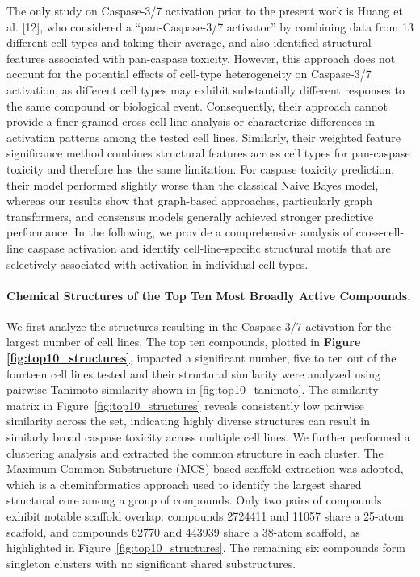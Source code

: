 \documentclass[letterpaper]{article}
\begin{document}
The only study on Caspase-3/7 activation prior to the present work is Huang et al. [12], who considered a “pan-Caspase-3/7 activator” by combining data from 13 different cell types and taking their average, and also identified structural features associated with pan-caspase toxicity. However, this approach does not account for the potential effects of cell-type heterogeneity on Caspase-3/7 activation, as different cell types may exhibit substantially different responses to the same compound or biological event. Consequently, their approach cannot provide a finer-grained cross-cell-line analysis or characterize differences in activation patterns among the tested cell lines. Similarly, their weighted feature significance method combines structural features across cell types for pan-caspase toxicity and therefore has the same limitation. For caspase toxicity prediction, their model performed slightly worse than the classical Naive Bayes model, whereas our results show that graph-based approaches, particularly graph transformers, and consensus models generally achieved stronger predictive performance. In the following, we provide a comprehensive analysis of cross-cell-line caspase activation and identify cell-line-specific structural motifs that are selectively associated with activation in individual cell types.



\paragraph{Chemical Structures of the Top Ten Most Broadly Active Compounds.}

We first analyze the structures resulting in the Caspase-3/7 activation for the largest number of cell lines. The top ten compounds, plotted in \textbf{Figure \ref{fig:top10_structures}}, impacted a significant number, five to ten out of the fourteen cell lines tested and their structural similarity were analyzed using pairwise Tanimoto similarity shown in \ref{fig:top10_tanimoto}. 
The similarity matrix in Figure~\ref{fig:top10_structures} reveals consistently low pairwise similarity across the set, indicating highly diverse structures can result in similarly broad caspase toxicity across multiple cell lines. We further performed a clustering analysis and extracted the common structure in each cluster. The Maximum Common Substructure (MCS)-based scaffold extraction was adopted, which is a cheminformatics approach used to identify the largest shared structural core among a group of compounds. Only two pairs of compounds exhibit notable scaffold overlap: compounds 2724411 and 11057 share a 25-atom scaffold, and compounds 62770 and 443939 share a 38-atom scaffold, as highlighted in Figure~\ref{fig:top10_structures}. The remaining six compounds form singleton clusters with no significant shared substructures.
\end{document}
